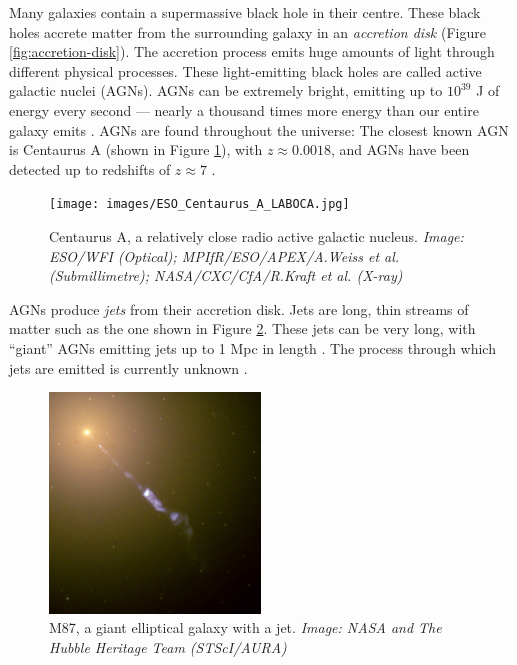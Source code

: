        Many galaxies contain a supermassive black hole in their centre. These
        black holes accrete matter from the surrounding galaxy in an
        \emph{accretion disk} (Figure \ref{fig:accretion-disk}). The accretion
        process emits huge amounts of light through different physical
        processes. These light-emitting black holes are called active galactic
        nuclei (AGNs). AGNs can be extremely bright, emitting up to $10^{39}$ J
        of energy every second --- nearly a thousand times more energy than our
        entire galaxy emits \citep{begelman84}. AGNs are found throughout the
        universe: The closest known AGN is Centaurus A (shown in Figure
        \ref{fig:centaurus-a}), with $z \approx 0.0018$, and AGNs have been
        detected up to redshifts of $z \approx 7$ .

        \begin{figure}[!ht]
            \centering
            \texttt{[image: images/ESO\_Centaurus\_A\_LABOCA.jpg]}
            \caption{Centaurus A, a relatively close radio active galactic
                nucleus. \emph{Image: ESO/WFI (Optical); MPIfR/ESO/APEX/A.Weiss
                et al. (Submillimetre); NASA/CXC/CfA/R.Kraft et al. (X-ray)}}
            \label{fig:centaurus-a}
        \end{figure}

        AGNs produce \emph{jets} from their accretion disk. Jets are long, thin
        streams of matter such as the one shown in Figure \ref{fig:m87}. These
        jets can be very long, with ``giant'' AGNs emitting jets up to 1 Mpc in
        length . The process
        through which jets are emitted is currently unknown .        %

        \begin{figure}[!ht]
            \centering
            \includegraphics[width=0.5\textwidth]{images/M87_jet.jpg}
            \caption{M87, a giant elliptical galaxy with a jet. \emph{Image:
                NASA and The Hubble Heritage Team (STScI/AURA)}}
            \label{fig:m87}
        \end{figure}

